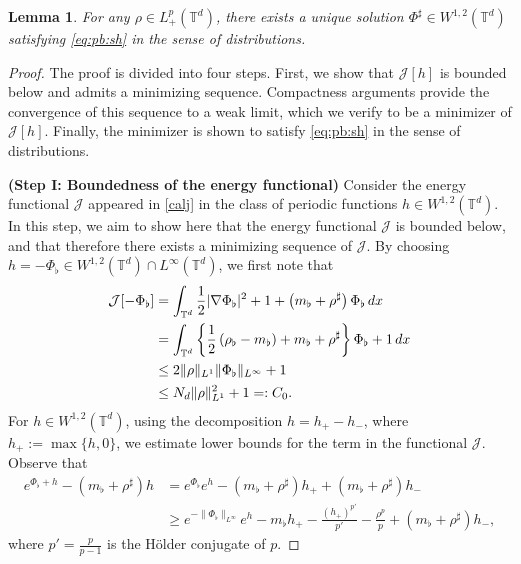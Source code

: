 \documentclass[11pt,reqno,a4paper]{amsart}
\newcommand{\intt}{\int_{\T^d}}
\newtheorem{lemma}{Lemma}[section]
\theoremstyle{definition}
\theoremstyle{remark}
\numberwithin{equation}{section}
\newcommand{\T} {\mathbb T}
\newcommand{\lt}{\left}
\newcommand{\rt}{\right}
\newcommand{\bq}{\begin{equation}}
\newcommand{\eq}{\end{equation}}
\newcommand{\calJ}{\mathcal J}
\newcommand{\dx}{\textnormal{d}x}
\begin{document}
\begin{lemma}\label{lem:cov}
For any $\rho \in L_+^p(\T^d)$, there exists a unique solution $\Phi^\sharp \in W^{1,2}(\T^d)$ satisfying \eqref{eq:pb:sh} in the sense of distributions.
\end{lemma}
\begin{proof}
The proof is divided into four steps. First, we show that $\calJ[h]$ is bounded below and admits a minimizing sequence. Compactness arguments provide the convergence of this sequence to a weak limit, which we verify to be a minimizer of $\calJ[h]$. Finally, the minimizer is shown to satisfy \eqref{eq:pb:sh} in the sense of distributions.  

\medskip


\noindent \textbf{(Step I: Boundedness of the energy functional)} Consider the energy functional $\calJ$ appeared in \eqref{calj} in the class of periodic functions $h \in W^{1,2}(\T^d)$.  In this step, we aim to show here that the energy functional $\calJ$ is bounded below, and that therefore there exists a minimizing sequence of $\calJ$. By choosing $h=-\Phi_\flat \in W^{1,2}(\T^d) \cap L^\infty(\T^d)$, we first note that
\bq\label{eq:jub}
\begin{split}
\calJ[-\Phi_\flat] &= \intt  \frac{1}{2}|\nabla \Phi_\flat|^2 +1  +\lt(m_\flat + \rho^\sharp \rt)\Phi_\flat\,\dx\\
&= \intt \lt\{ \frac{1}{2}\lt( \rho_\flat - m_\flat\rt) + m_\flat + \rho^\sharp \rt\}\Phi_\flat +1 \,\dx \\
&\le 2\|\rho\|_{L^1}\|\Phi_\flat\|_{L^\infty} +1\\
&\le N_d\|\rho\|_{L^1}^2 +1 =:C_0.
\end{split}
\eq
For $h \in W^{1,2}(\T^d)$, using the decomposition $h= h_+- h_-$, where $h_+:=\max\{h,0\}$, we estimate lower bounds for the term in the functional $\calJ$. Observe that
\begin{equation}\label{eq:jfm}
\begin{split}
e^{\Phi_\flat + h} - \lt(m_\flat + \rho^\sharp \rt)h &=  e^{\Phi_\flat}e^{h}-\lt(m_\flat + \rho^\sharp \rt) h_+ + \lt(m_\flat + \rho^\sharp \rt) h_- \\
&\ge e^{-\|\Phi_\flat\|_{L^\infty}}e^{h}-m_\flat h_+ - \frac{(h_+)^{p'}}{p'}- \frac{\rho^p}{p} + \lt(m_\flat + \rho^\sharp \rt) h_- ,
\end{split}
\end{equation}
where $p' = \frac p{p-1}$ is the H\"older conjugate of $p$.


\end{proof}
\end{document}
